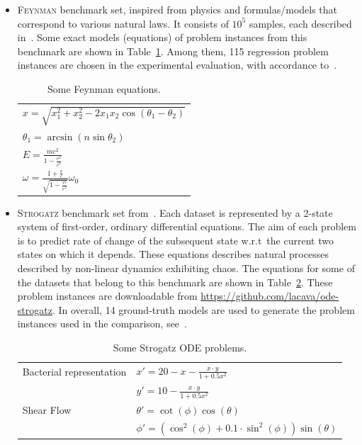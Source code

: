 \documentclass[a4paper,12pt]{elsarticle}
\begin{document}
\begin{itemize}
	\item \textsc{Feynman} benchmark set, inspired from physics and formulas/models that correspond to various natural laws.  
	It consists of $10^5$  samples, each described in~\cite{udrescu2020ai}. Some exact models (equations) of problem instances from this benchmark are shown in Table~\ref{tab:Feynamn-Eq}.  Among them, 115 regression problem instances are chosen in the experimental evaluation, with accordance to~\cite{la2021contemporary}. 
	
	\begin{table}
		\centering
		\begin{tabular}{l}   \hline
			$x = \sqrt{x_1^2 + x_2^2 - 2 x_1 x_2 \cos(\theta_1 - \theta_2)}$ \\
			$ \theta_1 = \arcsin(n \sin \theta_2)$ \\
			$E =  \frac{m c^2 }{1 - \frac{v^2}{c^2}}$ \\
			$\omega = \frac{1 + \frac{v}{c}}{ \sqrt{1 - \frac{v^2}{c^2}}} \omega_0$ \\ \hline
			
		\end{tabular}
		\caption{Some Feynman equations.}
		\label{tab:Feynamn-Eq}
	\end{table}
	
	
	\item \textsc{Strogatz} benchmark set from~\cite{la2016inference}. 
	Each dataset is represented by a 2-state system of first-order, ordinary differential equations. 
	The aim of each problem is to predict rate of change of the subsequent state w.r.t\  the current two states on which it depends. These equations describes natural processes described by non-linear dynamics  exhibiting chaos.  The equations for some of the datasets that belong to this benchmark are shown in Table~\ref{table:strogatz-ODEs}. These problem instances are downloadable from \url{https://github.com/lacava/ode-strogatz}. In overall, 14 ground-truth models are used to generate the problem instances used in the comparison, see~\cite{la2021contemporary}. 
	
	
	\begin{table}
		\centering
		\begin{tabular}{ll} \\ \hline
			Bacterial representation &   $x' = 20 - x - \frac{x \cdot y}{1 + 0.5 x^2 }$ \\ 
			&   $y' = 10 - \frac{x \cdot y}{1 + 0.5 x^2  }$ \\ \hline
			Shear Flow               &  $\theta' = \cot(\phi)\cos(\theta)$ \\
			&  $ \phi'  = ( \cos^2(\phi) + 0.1 \cdot \sin^2 (\phi)) \sin(\theta) $ \\ \hline
		\end{tabular}
		\caption{Some Strogatz ODE problems.}
		\label{table:strogatz-ODEs}
	\end{table}
	
	
\end{itemize}
\end{document}
